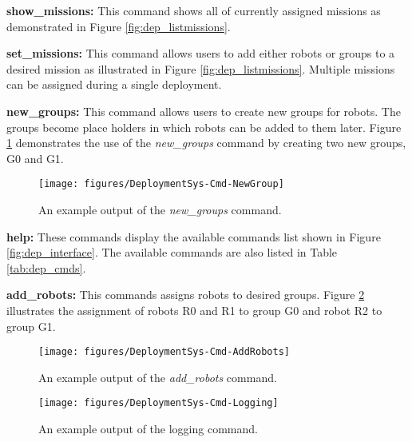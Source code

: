     \textbf{show\_missions:}
      This command shows all of currently assigned missions as demonstrated
        in Figure \ref{fig:dep_listmissions}.

    \textbf{set\_missions:}
      This command allows users to add either robots or groups to a desired
        mission as illustrated in Figure \ref{fig:dep_listmissions}.
      Multiple missions can be assigned during a single deployment.
 
    \textbf{new\_groups:}
      This command allows users to create new groups for robots.
      The groups become place holders in which robots can be added to them 
        later.
      Figure \ref{fig:dep_newgroup} demonstrates the use of the 
        \textit{new\_groups} command by creating two new groups, G0 and G1.
      \begin{figure}%
      \centerline{
          \texttt{[image: figures/DeploymentSys-Cmd-NewGroup]}}
      \caption{An example output of the \textit{new\_groups} command.}
      \label{fig:dep_newgroup}
      \end{figure}

    \textbf{help:}
      These commands display the available commands list shown in Figure
        \ref{fig:dep_interface}.
      The available commands are also listed in Table \ref{tab:dep_cmds}.

    \textbf{add\_robots:}
      This commands assigns robots to desired groups.
      Figure \ref{fig:dep_addrobots} illustrates the assignment of robots R0
        and R1 to group G0 and robot R2 to group G1.
      \begin{figure}%
      \centerline{
          \texttt{[image: figures/DeploymentSys-Cmd-AddRobots]}}
      \caption{An example output of the \textit{add\_robots} command.}
      \label{fig:dep_addrobots}
      \end{figure}

      \begin{figure}%
      \centerline{
          \texttt{[image: figures/DeploymentSys-Cmd-Logging]}}
      \caption{An example output of the logging command.}
      \label{fig:dep_logging}
      \end{figure}


